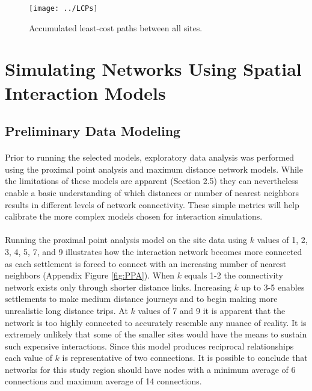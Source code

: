 \documentclass[12pt,a4paper]{thesis}
\begin{document}
\begin{figure}
\centering
\texttt{[image: ../LCPs]}
\caption{Accumulated least-cost paths between all sites.}
\label{fig:LCPs}
\end{figure}

\section{Simulating Networks Using Spatial Interaction Models}

\subsection{Preliminary Data Modeling}
\paragraph{}
Prior to running the selected models, exploratory data analysis was performed using the proximal point analysis and maximum distance network models. While the limitations of these models are apparent (Section 2.5) they can nevertheless enable a basic understanding of which distances or number of nearest neighbors results in different levels of network connectivity. These simple metrics will help calibrate the more complex models chosen for interaction simulations.

\paragraph{}
Running the proximal point analysis model on the site data using $k$ values of 1, 2, 3, 4, 5, 7, and 9 illustrates how the interaction network becomes more connected as each settlement is forced to connect with an increasing number of nearest neighbors (Appendix Figure \ref{fig:PPA}). When $k$ equals 1-2 the connectivity network exists only through shorter distance links. Increasing $k$ up to 3-5 enables settlements to make medium distance journeys and to begin making more unrealistic long distance trips. At $k$ values of 7 and 9 it is apparent that the network is too highly connected to accurately resemble any nuance of reality. It is extremely unlikely that some of the smaller sites would have the means to sustain such expensive interactions. Since this model produces reciprocal relationships each value of $k$ is representative of two connections. It is possible to conclude that networks for this study region should have nodes with a minimum average of 6 connections and maximum average of 14 connections.  
\end{document}
